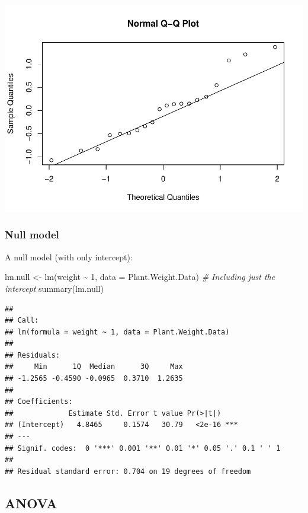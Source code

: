 \documentclass[
]{book}
\newenvironment{Shaded}{\begin{snugshade}}{\end{snugshade}}
\newcommand{\AttributeTok}[1]{\textcolor[rgb]{0.77,0.63,0.00}{#1}}
\newcommand{\CommentTok}[1]{\textcolor[rgb]{0.56,0.35,0.01}{\textit{#1}}}
\newcommand{\DecValTok}[1]{\textcolor[rgb]{0.00,0.00,0.81}{#1}}
\newcommand{\FunctionTok}[1]{\textcolor[rgb]{0.00,0.00,0.00}{#1}}
\newcommand{\NormalTok}[1]{#1}
\newcommand{\OtherTok}[1]{\textcolor[rgb]{0.56,0.35,0.01}{#1}}
\newcommand{\SpecialCharTok}[1]{\textcolor[rgb]{0.00,0.00,0.00}{#1}}
\begin{document}
\includegraphics{SurveyBook_files/figure-latex/simpleAnalysis224-1.pdf}

\hypertarget{null-model}{%
\subsubsection{Null model}\label{null-model}}

A null model (with only intercept):

\begin{Shaded}
\begin{Highlighting}[]
\NormalTok{lm.null }\OtherTok{\textless{}{-}} \FunctionTok{lm}\NormalTok{(weight }\SpecialCharTok{\textasciitilde{}} \DecValTok{1}\NormalTok{, }\AttributeTok{data =}\NormalTok{ Plant.Weight.Data) }\CommentTok{\# Including just the intercept}
\FunctionTok{summary}\NormalTok{(lm.null)}
\end{Highlighting}
\end{Shaded}

\begin{verbatim}
## 
## Call:
## lm(formula = weight ~ 1, data = Plant.Weight.Data)
## 
## Residuals:
##     Min      1Q  Median      3Q     Max 
## -1.2565 -0.4590 -0.0965  0.3710  1.2635 
## 
## Coefficients:
##             Estimate Std. Error t value Pr(>|t|)    
## (Intercept)   4.8465     0.1574   30.79   <2e-16 ***
## ---
## Signif. codes:  0 '***' 0.001 '**' 0.01 '*' 0.05 '.' 0.1 ' ' 1
## 
## Residual standard error: 0.704 on 19 degrees of freedom
\end{verbatim}

\hypertarget{anova}{%
\subsection{ANOVA}\label{anova}}
\end{document}
